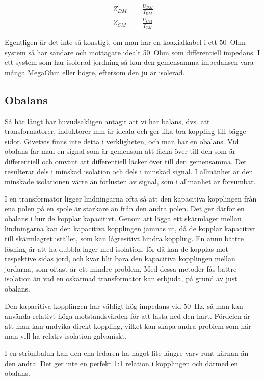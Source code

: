 \begin{eqnarray}
Z_{DM} = & \frac{U_{DM}}{I_{DM}}\\
Z_{CM} = & \frac{U_{CM}}{I_{CM}}
\end{eqnarray}

Egentligen är det inte så konstigt, om man har en koaxialkabel i ett 50~Ohm
system så har sändare och mottagare idealt 50~Ohm som differentiell impedans.
I ett system som har isolerad jordning så kan den gemensamma impedansen vara
många MegaOhm eller högre, eftersom den ju är isolerad.

\subsection{Obalans}

Så här långt har huvudsakligen antagit att vi har balans, dvs. att
transformatorer, induktorer mm är ideala och ger lika bra koppling till bägge
sidor. Givetvis finns inte detta i verkligheten, och man har en obalans.
Vid obalans får man en signal som är gemensam att läcka över till den som är
differentiell och omvänt att differentiell läcker över till den gemensamma.
Det resulterar dels i minskad isolation och dels i minskad signal.
I allmänhet är den minskade isolationen värre än förlusten av signal, som i
allmänhet är försumbar.

I en transformator ligger lindningarna ofta så att den kapacitiva kopplingen
från ena polen på en spole är starkare än från den andra polen.
Det ger därför en obalans i hur de kopplar kapacitivt. Genom att lägga ett
skärmlager mellan lindningarna kan den kapacitiva kopplingen jämnas ut, då de
kopplar kapacitivt till skärmlagret istället, som kan lågresitivt hindra
koppling. En ännu bättre lösning är att ha dubbla lager med isolation, för då
kan de kopplas mot respektive sidas jord, och kvar blir bara den kapacitiva
kopplingen mellan jordarna, som oftast är ett mindre problem. Med dessa metoder
fås bättre isolation än vad en oskärmad transformator kan erbjuda, på grund av
just obalans.

Den kapacitiva kopplingen har väldigt hög impedans vid 50~Hz, så man kan
använda relativt höga motståndsvärden för att lasta ned den hårt. Fördelen är
att man kan undvika direkt koppling, vilket kan skapa andra problem som när man
vill ha relativ isolation galvaniskt.

I en strömbalun kan den ena ledaren ha något lite längre varv runt kärnan än
den andra. Det ger inte en perfekt 1:1 relation i kopplingen och därmed en
obalans.

